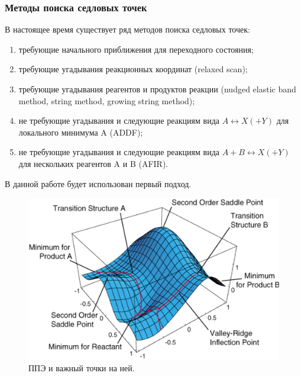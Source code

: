\subsubsection{Методы поиска седловых точек}
В настоящее время существует ряд методов поиска седловых точек:
\begin{enumerate}
    \item требующие начального приближения для переходного состояния;
    \item требующие угадывания реакционных координат (relaxed scan);
    \item требующие угадывания реагентов и продуктов реакции (nudged elastic band method, string method, growing string method);
    \item не требующие угадывания и следующие реакциям вида $A \leftrightarrow X(+Y)$ для локального минимума A (ADDF);
    \item не требующие угадывания и следующие реакциям вида $A + B \leftrightarrow X(+Y)$ для нескольких реагентов A и B (AFIR).
\end{enumerate}

В данной работе будет использован первый подход.

\begin{figure}[H]
\centering
\captionsetup{justification=centering}
\includegraphics[scale=0.8]{fig/2.png}
\caption{ППЭ и важный точки на ней.}
\end{figure}
    